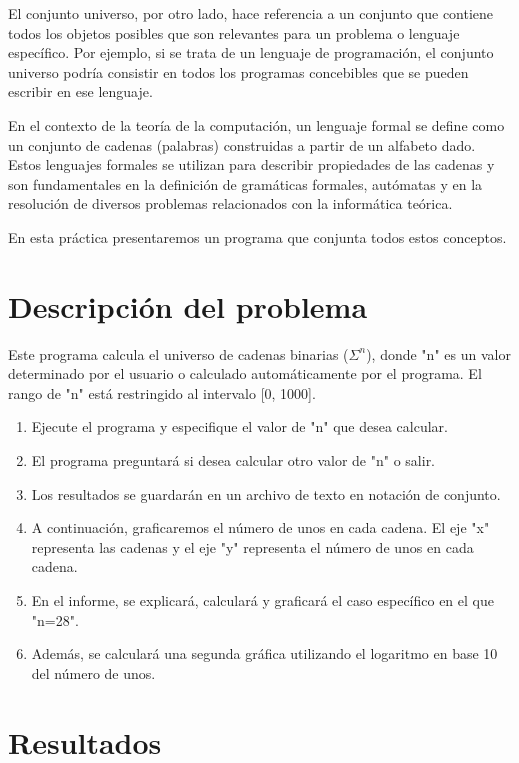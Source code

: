 \documentclass[11pt]{article} %
\begin{document}
	El conjunto universo, por otro lado, hace referencia a un conjunto que contiene todos los objetos posibles que son relevantes para un problema o lenguaje específico. Por ejemplo, si se trata de un lenguaje de programación, el conjunto universo podría consistir en todos los programas concebibles que se pueden escribir en ese lenguaje.
	
	En el contexto de la teoría de la computación, un lenguaje formal se define como un conjunto de cadenas (palabras) construidas a partir de un alfabeto dado. Estos lenguajes formales se utilizan para describir propiedades de las cadenas y son fundamentales en la definición de gramáticas formales, autómatas y en la resolución de diversos problemas relacionados con la informática teórica.
	
	En esta práctica presentaremos un programa que conjunta todos estos conceptos.
	
	\section{Descripción del problema}
	
	Este programa calcula el universo de cadenas binarias ($\Sigma^n$), donde "n" es un valor determinado por el usuario o calculado automáticamente por el programa. El rango de "n" está restringido al intervalo [0, 1000].
	
	\begin{enumerate}
		\item Ejecute el programa y especifique el valor de "n" que desea calcular.
		\item El programa preguntará si desea calcular otro valor de "n" o salir.
		\item Los resultados se guardarán en un archivo de texto en notación de conjunto.
		\item A continuación, graficaremos el número de unos en cada cadena. El eje "x" representa las cadenas y el eje "y" representa el número de unos en cada cadena.
		\item En el informe, se explicará, calculará y graficará el caso específico en el que "n=28".
		\item Además, se calculará una segunda gráfica utilizando el logaritmo en base 10 del número de unos.
	\end{enumerate}
	
	
	\section{Resultados}
	
\end{document}
